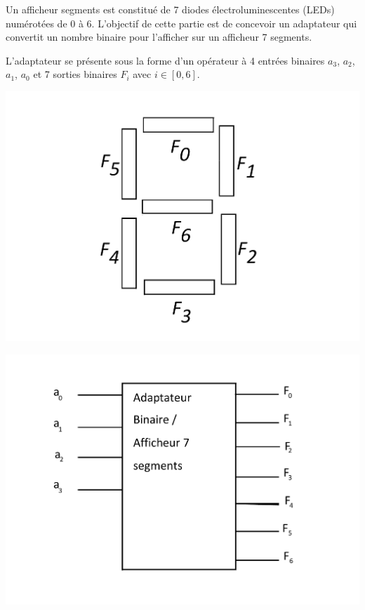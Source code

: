 Un afficheur  segments \fg est constitué de 7 diodes électroluminescentes (LEDs) numérotées de 0 à 6. L'objectif de cette partie est de concevoir un adaptateur qui convertit un nombre binaire pour l'afficher sur un afficheur 7 segments.

\begin{minipage}{0.3\linewidth}
L'adaptateur se présente sous la forme d'un opérateur à 4 entrées binaires $a_3$, $a_2$, $a_1$, $a_0$ et 7 sorties binaires $F_i$ avec $i \in \left[0,6\right]$.
\end{minipage}
\hfill
\begin{minipage}{0.3\linewidth}
 \centering\includegraphics[width=0.8\linewidth]{img/figures02.pdf}
\end{minipage}
\hfill
\begin{minipage}{0.3\linewidth}
 \centering\includegraphics[width=0.8\linewidth]{img/figures03.pdf}
\end{minipage}


